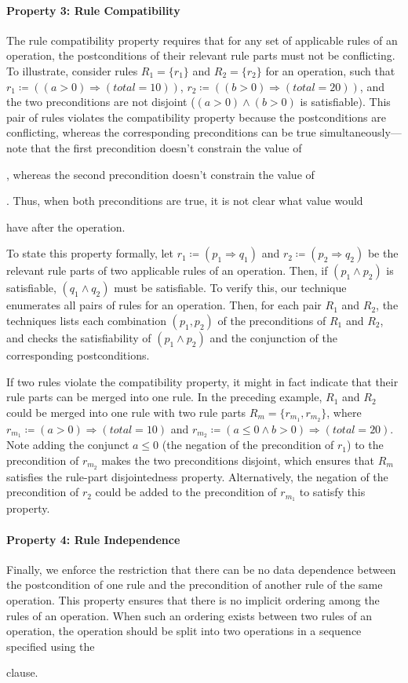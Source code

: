\paragraph*{Property 3: Rule Compatibility}
The rule compatibility property requires that for any set of applicable rules of
an operation, the postconditions of their relevant rule parts must not be
conflicting. To illustrate, consider rules $R_1 = \{r_1\}$ and $R_2 = \{r_2\}$
for an operation, such that $r_1 \coloneqq ((a > 0) \Longrightarrow (total =
10))$, $r_2 \coloneqq ((b > 0) \Longrightarrow (total = 20))$, and the two
preconditions are not disjoint (\ie $(a > 0) \wedge (b > 0)$ is
satisfiable). This pair of rules violates the compatibility property because the
postconditions are conflicting, whereas the corresponding preconditions can be
true simultaneously---note that the first precondition doesn't constrain the
value of \subject{b}, whereas the second precondition doesn't constrain the
value of \subject{a}. Thus, when both preconditions are true, it is not clear
what value would \subject{total} have after the operation.

To state this property formally, let $r_1 \coloneqq (p_1 \Longrightarrow q_1)$
and $r_2 \coloneqq (p_2 \Longrightarrow q_2)$ be the relevant rule parts of two
applicable rules of an operation. Then, if $(p_1 \wedge p_2)$ is satisfiable,
$(q_1 \wedge q_2)$ must be satisfiable. To verify this, our technique enumerates
all pairs of rules for an operation. Then, for each pair $R_1$ and $R_2$, the
techniques lists each combination $(p_1, p_2)$ of the preconditions of $R_1$ and
$R_2$, and checks the satisfiability of $(p_1 \wedge p_2)$ and the conjunction
of the corresponding postconditions.

If two rules violate the compatibility property, it might in fact indicate that
their rule parts can be merged into one rule. In the preceding example, $R_1$
and $R_2$ could be merged into one rule with two rule parts $R_m = \{r_{m_1},
r_{m_2}\}$, where $r_{m_1} \coloneqq (a > 0) \Longrightarrow (total = 10)$ and
$r_{m_2} \coloneqq (a \leq 0 \wedge b > 0) \Longrightarrow (total = 20)$. Note
adding the conjunct $a \leq 0$ (the negation of the precondition of $r_1$) to
the precondition of $r_{m_2}$ makes the two preconditions disjoint, which
ensures that $R_m$ satisfies the rule-part disjointedness
property. Alternatively, the negation of the precondition of $r_2$ could be
added to the precondition of $r_{m_1}$ to satisfy this property.

\paragraph*{Property 4: Rule Independence}
Finally, we enforce the restriction that there can be no data dependence between
the postcondition of one rule and the precondition of another rule of the same
operation. This property ensures that there is no implicit ordering among the
rules of an operation. When such an ordering exists between two rules of an
operation, the operation should be split into two operations in a sequence
specified using the \subject{next} clause.

